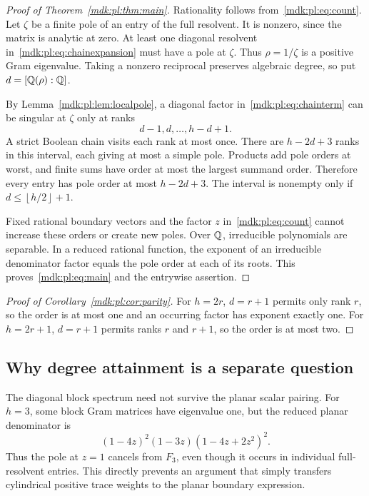 \documentclass[11pt,letterpaper]{article}
\numberwithin{equation}{section}
\theoremstyle{remark}\newtheorem{remark}[theorem]{Remark}
\newcommand{\floor}[1]{\left\lfloor #1\right\rfloor}
\begin{document}
\begin{proof}[Proof of Theorem~\ref{mdk:pl:thm:main}]
Rationality follows from~\eqref{mdk:pl:eq:count}. Let $\zeta$ be a finite pole of an entry of the full resolvent. It is nonzero, since the matrix is analytic at zero. At least one diagonal resolvent in~\eqref{mdk:pl:eq:chainexpansion} must have a pole at $\zeta$. Thus $\rho=1/\zeta$ is a positive Gram eigenvalue. Taking a nonzero reciprocal preserves algebraic degree, so put $d=[\mathbb Q(\rho):\mathbb Q]$.

By Lemma~\ref{mdk:pl:lem:localpole}, a diagonal factor in~\eqref{mdk:pl:eq:chainterm} can be singular at $\zeta$ only at ranks
\[
 d-1,d,\ldots,h-d+1.
\]
A strict Boolean chain visits each rank at most once. There are $h-2d+3$ ranks in this interval, each giving at most a simple pole. Products add pole orders at worst, and finite sums have order at most the largest summand order. Therefore every entry has pole order at most $h-2d+3$. The interval is nonempty only if $d\le\floor{h/2}+1$.

Fixed rational boundary vectors and the factor $z$ in~\eqref{mdk:pl:eq:count} cannot increase these orders or create new poles. Over $\mathbb Q$, irreducible polynomials are separable. In a reduced rational function, the exponent of an irreducible denominator factor equals the pole order at each of its roots. This proves~\eqref{mdk:pl:eq:main} and the entrywise assertion.
\end{proof}

\begin{proof}[Proof of Corollary~\ref{mdk:pl:cor:parity}]
For $h=2r$, $d=r+1$ permits only rank $r$, so the order is at most one and an occurring factor has exponent exactly one. For $h=2r+1$, $d=r+1$ permits ranks $r$ and $r+1$, so the order is at most two.
\end{proof}

\subsection{Why degree attainment is a separate question}
The diagonal block spectrum need not survive the planar scalar pairing. For $h=3$, some block Gram matrices have eigenvalue one, but the reduced planar denominator is
\begin{equation}\label{mdk:pl:eq:h3den}
 (1-4z)^2(1-3z)(1-4z+2z^2)^2.
\end{equation}
Thus the pole at $z=1$ cancels from $F_3$, even though it occurs in individual full-resolvent entries. This directly prevents an argument that simply transfers cylindrical positive trace weights to the planar boundary expression.
\end{document}
